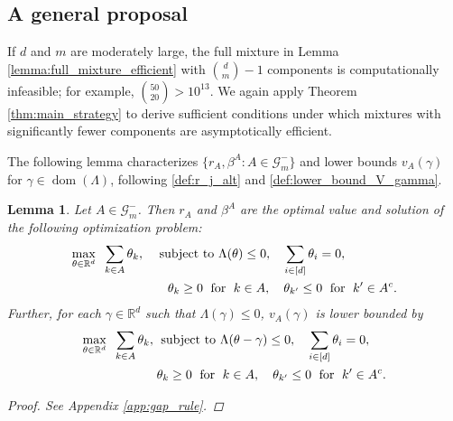 \documentclass[aap,preprint]{imsart}
\newcommand{\Mstar}{[m]}
\newcommand{\bR}{{\mathbb{R}}}
\theoremstyle{plain}
\newtheorem{lemma}[theorem]{Lemma}
\theoremstyle{definition}
\begin{document}
\subsection{A general proposal}
If $d$ and $m$ are moderately large, the full mixture in Lemma \ref{lemma:full_mixture_efficient} with $\binom{d}{m}-1$ components
is computationally infeasible; for example, $\binom{50}{20} > 10^{13}$.  We again apply Theorem \ref{thm:main_strategy} to derive sufficient conditions under which mixtures with significantly fewer components are asymptotically efficient.


The following lemma characterizes $\{r_A, \beta^{A}: A \in \mathcal{G}_m^{-}\}$ and lower bounds $v_A(\gamma)$ 
for $\gamma \in \operatorname{dom}(\Lambda)$, following  \eqref{def:r_j_alt} and \eqref{def:lower_bound_V_gamma}.

\begin{lemma}\label{lemma:gap_opt_probs}
Let $ A \in \mathcal{G}_m^{-}$. Then $r_A$ and $\beta^A$ are the optimal value and solution of the following optimization problem:
\begin{align*}
 \max_{\theta \in \bR^d} \;\;  \sum_{k \in A} \theta_k, \quad &\textup{ subject to }   \Lambda(\theta) \leq 0, \quad \sum_{i \in [d]} \theta_i = 0, \\
& \quad \theta_k \geq 0\; \text{ for } \;k \in A, \quad \theta_{k'} \leq 0\; \text{ for } \;k' \in A^c.
\end{align*}
Further, for each $\gamma \in \bR^d$ such that $\Lambda(\gamma) \leq 0$, $v_A(\gamma)$ is lower bounded by
\begin{align*}
\max_{\theta \in \bR^d} \;\;  \sum_{k \in A} \theta_k, \; &\textup{ subject to }  \Lambda(\theta - \gamma) \leq 0, \quad \sum_{i \in [d]} \theta_i = 0, \\
&\theta_k \geq 0\; \text{ for } \;k \in A, \quad \theta_{k'} \leq 0\; \text{ for } \;k' \in A^c.
\end{align*}
\begin{proof}
    See Appendix \ref{app:gap_rule}.
\end{proof}
\end{lemma}

\end{document}
